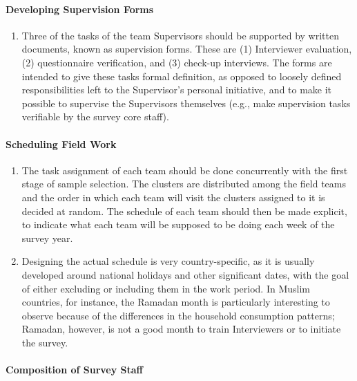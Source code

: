 \documentclass[
]{article}
\providecommand{\tightlist}{%
  \setlength{\itemsep}{0pt}\setlength{\parskip}{0pt}}
\begin{document}
\hypertarget{developing-supervision-forms-1}{%
\paragraph{Developing Supervision Forms}\label{developing-supervision-forms-1}}

\begin{enumerate}
\def\labelenumi{\arabic{enumi}.}
\setcounter{enumi}{360}
\tightlist
\item
  Three of the tasks of the team Supervisors should be supported by
  written documents, known as supervision forms. These are (1)
  Interviewer evaluation, (2) questionnaire verification, and (3)
  check-up interviews. The forms are intended to give these tasks
  formal definition, as opposed to loosely defined responsibilities
  left to the Supervisor's personal initiative, and to make it
  possible to supervise the Supervisors themselves (e.g., make
  supervision tasks verifiable by the survey core staff).
\end{enumerate}

\hypertarget{scheduling-field-work-1}{%
\paragraph{Scheduling Field Work}\label{scheduling-field-work-1}}

\begin{enumerate}
\def\labelenumi{\arabic{enumi}.}
\setcounter{enumi}{361}
\item
  The task assignment of each team should be done concurrently with
  the first stage of sample selection. The clusters are distributed
  among the field teams and the order in which each team will visit
  the clusters assigned to it is decided at random. The schedule of
  each team should then be made explicit, to indicate what each team
  will be supposed to be doing each week of the survey year.
\item
  Designing the actual schedule is very country-specific, as it is
  usually developed around national holidays and other significant
  dates, with the goal of either excluding or including them in the
  work period. In Muslim countries, for instance, the Ramadan month is
  particularly interesting to observe because of the differences in
  the household consumption patterns; Ramadan, however, is not a good
  month to train Interviewers or to initiate the survey.
\end{enumerate}

\hypertarget{composition-of-survey-staff-1}{%
\paragraph{Composition of Survey Staff}\label{composition-of-survey-staff-1}}
\end{document}
